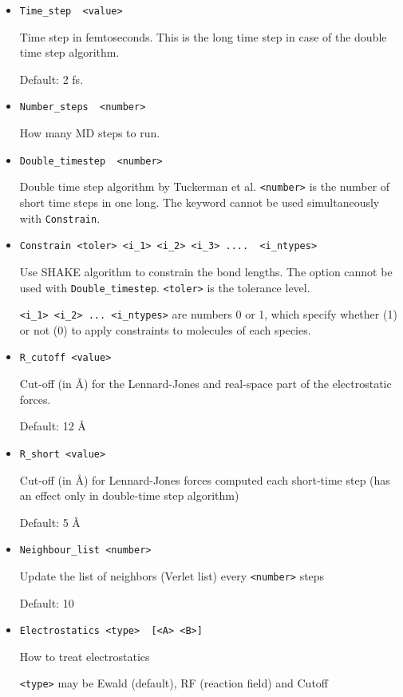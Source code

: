 \documentclass{article}
\begin{document}
\begin{itemize}
\item
\verb|Time_step  <value>|

Time step in femtoseconds. This is the long time step in case of the double 
time step algorithm. 

Default:  2 fs.

\item
\verb|Number_steps  <number>|

How many MD steps to run. 

\item
\verb|Double_timestep  <number>|

Double time step algorithm by Tuckerman et al. \verb|<number>| is the number
of short time steps in one long. The keyword cannot be used simultaneously
with \verb|Constrain|.

\item
\verb|Constrain <toler> <i_1> <i_2> <i_3> ....  <i_ntypes>|

Use SHAKE algorithm to constrain the bond lengths. The option cannot be used
with \verb|Double_timestep|. \verb|<toler>| is the tolerance level.

\verb|<i_1> <i_2> ... <i_ntypes>| are numbers 0 or 1, which specify 
whether (1) or not (0) to apply constraints to molecules of each species.

\item
\verb|R_cutoff <value>|

Cut-off (in \AA) for the Lennard-Jones and real-space part of the 
electrostatic forces.

Default:  12 \AA

\item
\verb|R_short <value>|

Cut-off (in \AA) for Lennard-Jones forces computed each short-time step
(has an effect only in double-time step algorithm)

Default:  5 \AA

\item
\verb|Neighbour_list <number>|

Update the list of neighbors (Verlet list) every \verb|<number>| steps

Default: 10

\item
\verb|Electrostatics <type>  [<A> <B>]|

How to treat electrostatics

\verb|<type>| may be Ewald (default), RF (reaction field) and Cutoff


\end{itemize}
\end{document}
